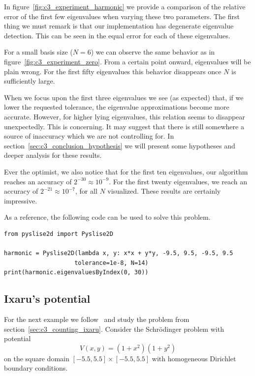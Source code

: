 In figure~\ref{fig:c3_experiment_harmonic} we provide a comparison of the relative error of the first few eigenvalues when varying these two parameters. The first thing we must remark is that our implementation has degenerate eigenvalue detection. This can be seen in the equal error for each of these eigenvalues.

For a small basis size ($N = 6$) we can observe the same behavior as in figure~\ref{fig:c3_experiment_zero}. From a certain point onward, eigenvalues will be plain wrong. For the first fifty eigenvalues this behavior disappears once $N$ is sufficiently large.

When we focus upon the first three eigenvalues we see (as expected) that, if we lower the requested tolerance, the eigenvalue approximations become more accurate. However, for higher lying eigenvalues, this relation seems to disappear unexpectedly. This is concerning. It may suggest that there is still somewhere a source of inaccuracy which we are not controlling for. In section~\ref{sec:c3_conclusion_hypothesis} we will present some hypotheses and deeper analysis for these results.

Ever the optimist, we also notice that for the first ten eigenvalues, our algorithm reaches an accuracy of $2^{-30} \approx 10^{-9}$. For the first twenty eigenvalues, we reach an accuracy of $2^{-21} \approx 10^{-7}$, for all $N$ visualized. These results are certainly impressive.

As a reference, the following code can be used to solve this problem.
\begin{verbatim}
from pyslise2d import Pyslise2D

harmonic = Pyslise2D(lambda x, y: x*x + y*y, -9.5, 9.5, -9.5, 9.5
                    tolerance=1e-8, N=14)
print(harmonic.eigenvaluesByIndex(0, 30))
\end{verbatim}


\subsection{Ixaru's potential}\label{sec:c3_experiment_ixaru}

For the next example we follow~\cite{ixaru_new_2010} and study the problem from section~\ref{sec:c3_counting_ixaru}. Consider the Schrödinger problem with potential
$$
  V(x, y) = (1+x^2)(1+y^2)
$$
on the square domain $[-5.5, 5.5] \times [-5.5, 5.5]$ with homogeneous Dirichlet boundary conditions.


